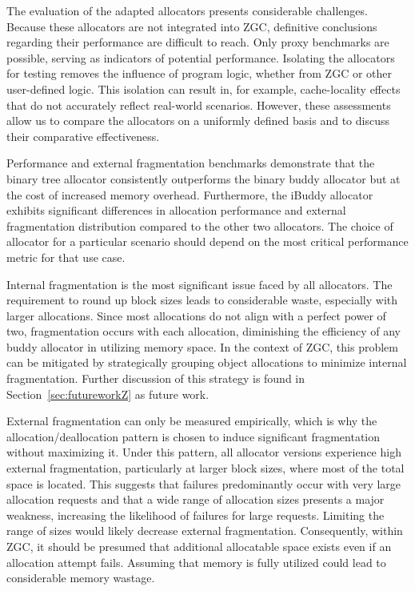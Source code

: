 
The evaluation of the adapted allocators presents considerable challenges. Because these allocators are not integrated into ZGC, definitive conclusions regarding their performance are difficult to reach. Only proxy benchmarks are possible, serving as indicators of potential performance. Isolating the allocators for testing removes the influence of program logic, whether from ZGC or other user-defined logic. This isolation can result in, for example, cache-locality effects that do not accurately reflect real-world scenarios. However, these assessments allow us to compare the allocators on a uniformly defined basis and to discuss their comparative effectiveness.

Performance and external fragmentation benchmarks demonstrate that the binary tree allocator consistently outperforms the binary buddy allocator but at the cost of increased memory overhead. Furthermore, the iBuddy allocator exhibits significant differences in allocation performance and external fragmentation distribution compared to the other two allocators. The choice of allocator for a particular scenario should depend on the most critical performance metric for that use case.

Internal fragmentation is the most significant issue faced by all allocators. The requirement to round up block sizes leads to considerable waste, especially with larger allocations. Since most allocations do not align with a perfect power of two, fragmentation occurs with each allocation, diminishing the efficiency of any buddy allocator in utilizing memory space. In the context of ZGC, this problem can be mitigated by strategically grouping object allocations to minimize internal fragmentation. Further discussion of this strategy is found in Section~\ref{sec:futureworkZ} as future work.

External fragmentation can only be measured empirically, which is why the allocation/deallocation pattern is chosen to induce significant fragmentation without maximizing it. Under this pattern, all allocator versions experience high external fragmentation, particularly at larger block sizes, where most of the total space is located. This suggests that failures predominantly occur with very large allocation requests and that a wide range of allocation sizes presents a major weakness, increasing the likelihood of failures for large requests. Limiting the range of sizes would likely decrease external fragmentation. Consequently, within ZGC, it should be presumed that additional allocatable space exists even if an allocation attempt fails. Assuming that memory is fully utilized could lead to considerable memory wastage.

